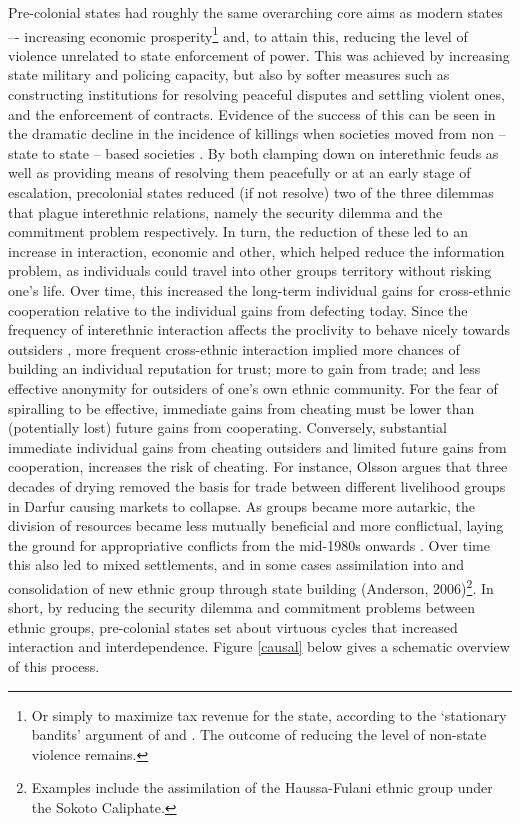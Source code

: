 \documentclass[12pt]{article}
\begin{document}
Pre-colonial states had roughly the same overarching core aims as modern states
–- increasing economic prosperity\footnote{Or simply to maximize tax revenue for
	the state, according to the `stationary bandits' argument of
	\citet{tilly_1985} and \citet{Olson1993}. The outcome of reducing the
level of non-state violence remains.} and, to attain this, reducing the level of
violence unrelated to state enforcement of power. This was achieved by
increasing state military and policing capacity, but also by softer measures
such as constructing institutions for resolving peaceful disputes and settling
violent ones, and the enforcement of contracts.  Evidence of the success of this
can be seen in the dramatic decline in the incidence of killings when societies
moved from non -- state to state -- based societies \citep[64ff]{Pinker2012}. By
both clamping down on interethnic feuds as well as providing means of resolving
them peacefully or at an early stage of escalation, precolonial states reduced
(if not resolve) two of the three dilemmas that plague interethnic relations,
namely the security dilemma and the commitment problem respectively. In turn,
the reduction of these led to an increase in interaction, economic and other,
which helped reduce the information problem, as individuals could travel into
other groups territory without risking one’s life. Over time, this increased the
long-term individual gains for cross-ethnic cooperation relative to the
individual gains from defecting today. Since the frequency of interethnic
interaction affects the proclivity to behave nicely towards outsiders
\citep[721]{Fearon_1996}, more frequent cross-ethnic interaction implied more
chances of building an individual reputation for trust; more to gain from trade;
and less effective anonymity for outsiders of one’s own ethnic community. For
the fear of spiralling to be effective, immediate gains from cheating must be
lower than (potentially lost) future gains from cooperating. Conversely,
substantial immediate individual gains from cheating outsiders and limited
future gains from cooperation, increases the risk of cheating. For instance,
Olsson argues that three decades of drying removed the basis for trade between
different livelihood groups in Darfur causing markets to collapse. As groups
became more autarkic, the division of resources became less mutually beneficial
and more conflictual, laying the ground for appropriative conflicts from the
mid-1980s onwards \citep{Olsson2016}. Over time this also led to mixed settlements,
and in some cases assimilation into and consolidation of new ethnic group
through state building (Anderson, 2006)\footnote{Examples include the
assimilation of the Haussa-Fulani ethnic group under the Sokoto Caliphate.}. In
short, by reducing the security dilemma and commitment problems between ethnic
groups, pre-colonial states set about virtuous cycles that increased interaction
and interdependence. Figure \ref{causal} below gives a schematic overview of
this process.
\end{document}
